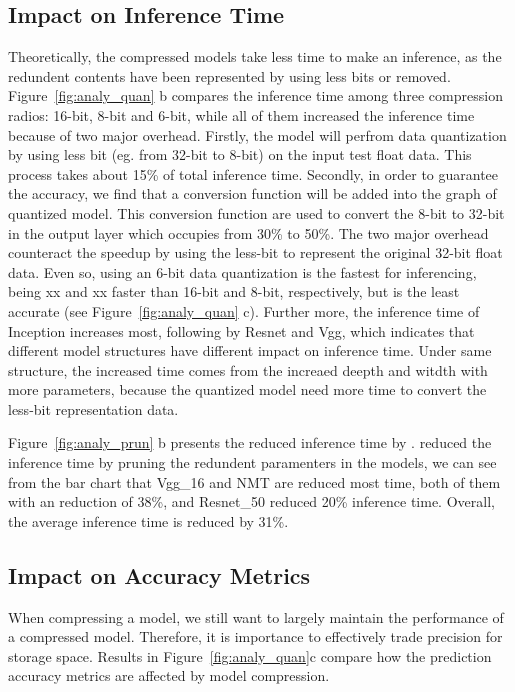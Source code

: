 \subsection{Impact on Inference Time}
Theoretically, the compressed models take less time to make an inference, as 
the redundent contents have been represented by using less bits or removed.
Figure~\ref{fig:analy_quan} b compares the inference time
among three compression radios: 16-bit, 8-bit and 6-bit, while all of them 
increased the inference time because of two major overhead.
Firstly, the model will perfrom data quantization by using less bit (eg. from 32-bit to 8-bit) on
the input test float data. This process takes about 15\% of total inference time.
Secondly, in order to guarantee the accuracy, we find that a conversion function will be added into 
the graph of quantized model. This conversion function are used to convert the 8-bit to 32-bit in the output layer which 
occupies from 30\% to 50\%.
The two major overhead counteract the speedup by using the less-bit to represent the original 32-bit float data. 
Even so, using an 6-bit data quantization is the fastest for inferencing,
being xx and xx faster than 16-bit and 8-bit, respectively, 
but is the least accurate (see Figure~\ref{fig:analy_quan} c). 
Further more, the inference time of Inception increases most, following by Resnet and Vgg,
which indicates that different model structures have different impact on inference time.
Under same structure, the increased time comes from the increaed deepth and witdth with more parameters, 
because the quantized model need more time to convert the less-bit representation data.


Figure~\ref{fig:analy_prun} b presents the reduced inference time by \pruning.
\pruning reduced the inference time by pruning the redundent paramenters in the models,
we can see from the bar chart that
Vgg\_16 and NMT are reduced most time, both of them with an reduction of 38\%, and 
Resnet\_50 reduced 20\% inference time. Overall, the average inference time is reduced by 31\%.


\subsection{Impact on Accuracy Metrics}
When compressing a model, we still want to largely maintain the performance of a compressed model. Therefore, it is importance to
effectively trade precision for storage space. Results in Figure~\ref{fig:analy_quan}c compare how the prediction accuracy metrics are affected by model
compression.

